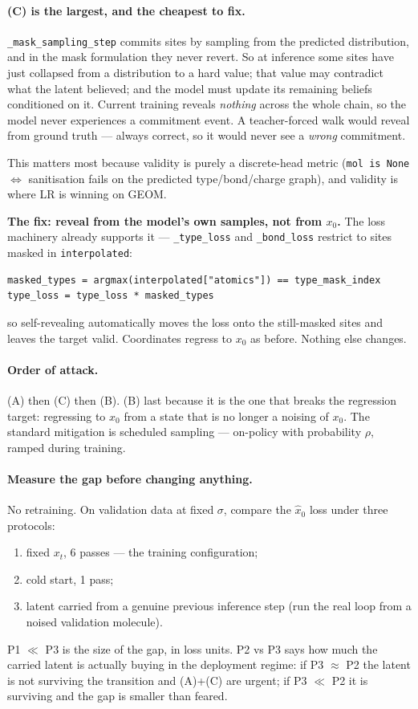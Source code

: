\documentclass[11pt,a4paper]{article}
\newcommand{\xh}{\hat{x}_0}
\newcommand{\code}[1]{\texttt{#1}}
\begin{document}
\paragraph{(C) is the largest, and the cheapest to fix.} \code{\_mask\_sampling\_step}
commits sites by sampling from the predicted distribution, and in the mask formulation
they never revert. So at inference some sites have just collapsed from a distribution
to a hard value; that value may contradict what the latent believed; and the model must
update its remaining beliefs conditioned on it. Current training reveals \emph{nothing}
across the whole chain, so the model never experiences a commitment event. A
teacher-forced walk would reveal from ground truth --- always correct, so it would
never see a \emph{wrong} commitment.

This matters most because validity is purely a discrete-head metric
(\code{mol is None} $\Leftrightarrow$ sanitisation fails on the predicted
type/bond/charge graph), and validity is where LR is winning on GEOM.

\textbf{The fix: reveal from the model's own samples, not from $x_0$.} The loss
machinery already supports it --- \code{\_type\_loss} and \code{\_bond\_loss} restrict
to sites masked in \code{interpolated}:
\begin{lstlisting}
masked_types = argmax(interpolated["atomics"]) == type_mask_index
type_loss = type_loss * masked_types
\end{lstlisting}
so self-revealing automatically moves the loss onto the still-masked sites and leaves
the target valid. Coordinates regress to $x_0$ as before. Nothing else changes.

\paragraph{Order of attack.} (A) then (C) then (B). (B) last because it is the one that
breaks the regression target: regressing to $x_0$ from a state that is no longer a
noising of $x_0$. The standard mitigation is scheduled sampling --- on-policy with
probability $\rho$, ramped during training.

\paragraph{Measure the gap before changing anything.} No retraining. On validation data
at fixed $\sigma$, compare the $\xh$ loss under three protocols:
\begin{enumerate}[label=P\arabic*.]
  \item fixed $x_t$, 6 passes --- the training configuration;
  \item cold start, 1 pass;
  \item latent carried from a genuine previous inference step (run the real loop from a
        noised validation molecule).
\end{enumerate}
P1 $\ll$ P3 is the size of the gap, in loss units. P2 vs P3 says how much the carried
latent is actually buying in the deployment regime: if P3 $\approx$ P2 the latent is not
surviving the transition and (A)+(C) are urgent; if P3 $\ll$ P2 it is surviving and the
gap is smaller than feared.
\end{document}
